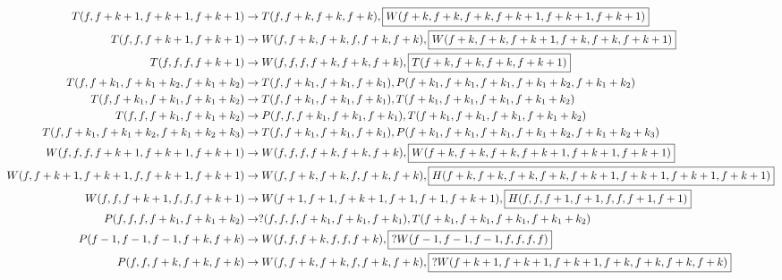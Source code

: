 \documentclass[9pt]{extarticle}
\newcommand{\tzma}[1]{\tikz[overlay,remember picture] \node (#1) {};}
\begin{document}
{\small
\setlength{\jot}{20pt}
\begin{equation}
  \begin{aligned}
    T(f,f+k+1,\tzma{T13}f+k+1,f+k+1)               & \rightarrow T(f,f+k,\tzma{oT13}f+k,f+k),\boxed{W(f+k,f+k,f+k,f+k+1,f+k+1,f+k+1)}                        \\
    T(f,f,\tzma{T22}f+k+1,f+k+1)                   & \rightarrow W(f,f+k,f+k,\tzma{oW1212}f,f+k,f+k),\boxed{W(f+k,f+k,f+k+1,f+k,f+k,f+k+1)}                  \\
    T(f,f,\tzma{T31}f,f+k+1)                       & \rightarrow W(f,f,f,\tzma{oW33}f+k,f+k,f+k),\boxed{T(f+k,f+k,f+k,f+k+1)}                                \\
    T(f,f+k_1, \tzma{T112}f+k_1+k_2,f+k_1+k_2)     & \rightarrow T(f,f+k_1,\tzma{o1T13}f+k_1,f+k_1),P(f+k_1,f+k_1,f+k_1,\tzma{oP32}f+k_1+k_2,f+k_1+k_2)      \\
    T(f,f+k_1,\tzma{T121}f+k_1,f+k_1+k_2)          & \rightarrow T(f,f+k_1,\tzma{o2T13}f+k_1,f+k_1), T(f+k_1,f+k_1,\tzma{oT211}f+k_1,f+k_1+k_2)              \\
    T(f,f,\tzma{T211}f+k_1,f+k_1+k_2)              & \rightarrow P(f,f,\tzma{oP23}f+k_1,f+k_1,f+k_1), T(f+k_1,f+k_1,\tzma{oT31}f+k_1,f+k_1+k_2)              \\
    T(f,f+k_1,\tzma{T1111}f+k_1+k_2,f+k_1+k_2+k_3) & \rightarrow T(f,f+k_1,\tzma{o3T13}f+k_1,f+k_1),P(f+k_1,f+k_1,f+k_1,\tzma{oP311}f+k_1+k_2,f+k_1+k_2+k_3) \\
    W(f,f,f,\tzma{W33}f+k+1,f+k+1,f+k+1)           & \rightarrow W(f,f,f,\tzma{o1W33}f+k,f+k,f+k),\boxed{W(f+k,f+k,f+k,f+k+1,f+k+1,f+k+1)}                   \\
    W(f,f+k+1,f+k+1,\tzma{W1212}f,f+k+1,f+k+1)     & \rightarrow W(f,f+k,f+k,\tzma{o1W1212}f,f+k,f+k),\boxed{H(f+k,f+k,f+k,f+k,f+k+1,f+k+1,f+k+1,f+k+1)}     \\
    W(f,f,f+k+1,\tzma{W2121}f,f,f+k+1)             & \rightarrow W(f+1,f+1,f+k+1,\tzma{o1W2121}f+1,f+1,f+k+1),\boxed{H(f,f,f+1,f+1,f,f,f+1,f+1)}             \\
    P(f,f,f,\tzma{P311}f+k_1,f+k_1+k_2)            & \rightarrow ?(f,f,f,f+k_1,f+k_1,f+k_1), T(f+k_1,f+k_1,\tzma{o1T31}f+k_1,f+k_1+k_2)                      \\
    P(f-1,f-1,\tzma{P32}f-1,f+k,f+k)               & \rightarrow W(f,f,f+k,\tzma{oW2121}f,f,f+k),\boxed{?W(f-1,f-1,f-1,f,f,f,f)}                             \\
    P(f, f, \tzma{P23}f+k,f+k,f+k)                 & \rightarrow W(f,f+k,f+k\tzma{o2W1212},f,f+k,f+k),\boxed{?W(f+k+1,f+k+1,f+k+1,f+k,f+k,f+k,f+k)}

\end{aligned}
\end{equation}}
\end{document}

